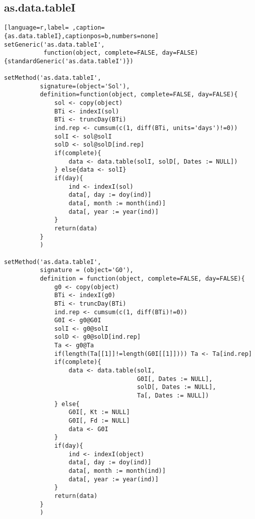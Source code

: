 \subsection{as.data.tableI}
\label{sec:org4a34034}
\label{subsec:as.data.tablei}
\begin{lstlisting}[language=r,label= ,caption={as.data.tableI},captionpos=b,numbers=none]
setGeneric('as.data.tableI',
           function(object, complete=FALSE, day=FALSE){standardGeneric('as.data.tableI')})

setMethod('as.data.tableI',
          signature=(object='Sol'),
          definition=function(object, complete=FALSE, day=FALSE){
              sol <- copy(object)
              BTi <- indexI(sol)
              BTi <- truncDay(BTi)
              ind.rep <- cumsum(c(1, diff(BTi, units='days')!=0))
              solI <- sol@solI
              solD <- sol@solD[ind.rep]
              if(complete){
                  data <- data.table(solI, solD[, Dates := NULL])
              } else{data <- solI}
              if(day){
                  ind <- indexI(sol)
                  data[, day := doy(ind)]
                  data[, month := month(ind)]
                  data[, year := year(ind)]
              }
              return(data)
          }
          )

setMethod('as.data.tableI',
          signature = (object='G0'),
          definition = function(object, complete=FALSE, day=FALSE){
              g0 <- copy(object)
              BTi <- indexI(g0)
              BTi <- truncDay(BTi)
              ind.rep <- cumsum(c(1, diff(BTi)!=0))
              G0I <- g0@G0I
              solI <- g0@solI
              solD <- g0@solD[ind.rep]
              Ta <- g0@Ta
              if(length(Ta[[1]]!=length(G0I[[1]]))) Ta <- Ta[ind.rep]
              if(complete){
                  data <- data.table(solI,
                                     G0I[, Dates := NULL],
                                     solD[, Dates := NULL],
                                     Ta[, Dates := NULL])
              } else{    
                  G0I[, Kt := NULL]
                  G0I[, Fd := NULL]
                  data <- G0I
              }
              if(day){
                  ind <- indexI(object)
                  data[, day := doy(ind)]
                  data[, month := month(ind)]
                  data[, year := year(ind)]
              }
              return(data)
          }
          )


\end{lstlisting}
